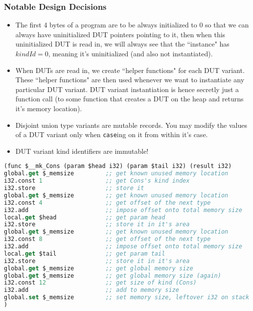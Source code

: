 \documentclass{beamer}
\begin{document}
\begin{frame}
\frametitle{Notable Design Decisions}

\begin{itemize}
 \item<1-> The first 4 bytes of a program are to be always initialized to 0 so that we can always have uninitialized DUT pointers pointing to it, then when this uninitialized DUT is read in, we will always see that the ``instance" has $kindId = 0$, meaning it's uninitialized (and also not instantiated).
 \item<2-> When DUTs are read in, we create ``helper functions" for each DUT variant. These ``helper functions" are then used whenever we want to instantiate any particular DUT variant. DUT variant instantiation is hence secretly just a function call (to some function that creates a DUT on the heap and returns it's memory location).
 \item<3-> Disjoint union type variants are mutable records. You may modify the values of a DUT variant only when \texttt{case}ing on it from within it's case. 
 \item<4-> DUT variant kind identifiers are immutable!
\end{itemize}
\end{frame}

\begin{lrbox}{\exampleInstantiationHelper}
\begin{lstlisting}[language=Lisp,basicstyle=\tiny]
(func $__mk_Cons (param $head i32) (param $tail i32) (result i32)
global.get $_memsize         ;; get known unused memory location
i32.const 1                  ;; get Cons's kind index
i32.store                    ;; store it
global.get $_memsize         ;; get known unused memory location
i32.const 4                  ;; get offset of the next type
i32.add                      ;; impose offset onto total memory size
local.get $head              ;; get param head
i32.store                    ;; store it in it's area
global.get $_memsize         ;; get known unused memory location
i32.const 8                  ;; get offset of the next type
i32.add                      ;; impose offset onto total memory size
local.get $tail              ;; get param tail
i32.store                    ;; store it in it's area
global.get $_memsize         ;; get global memory size
global.get $_memsize         ;; get global memory size (again)
i32.const 12                 ;; get size of kind (Cons)
i32.add                      ;; add to memory size
global.set $_memsize         ;; set memory size, leftover i32 on stack which is the returned pointer to the generated Cons
)
\end{lstlisting}
\end{lrbox}
\end{document}
